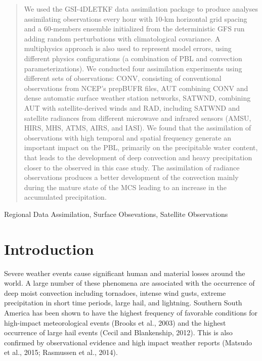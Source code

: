 \documentclass[final,5p,times,twocolumn,authoryear]{elsarticle} %
\begin{document}
\begin{frontmatter}
\begin{abstract}
  We used the GSI-4DLETKF data assimilation package to produce analyses assimilating observations every hour with 10-km horizontal grid spacing and a 60-members ensemble initialized from the deterministic GFS run adding random perturbations with climatological covariance. A multiphysics approach is also used to represent model errors, using different physics configurations (a combination of PBL and convection parameterizations). We conducted four assimilation experiments using different sets of observations: CONV, consisting of conventional observations from NCEP's prepBUFR files, AUT combining CONV and dense automatic surface weather station networks, SATWND, combining AUT with satellite-derived winds and RAD, including SATWND and satellite radiances from different microwave and infrared sensors (AMSU, HIRS, MHS, ATMS, AIRS, and IASI). We found that the assimilation of observations with high temporal and spatial frequency generate an important impact on the PBL, primarily on the precipitable water content, that leads to the development of deep convection and heavy precipitation closer to the observed in this case study. The assimilation of radiance observations produces a better development of the convection mainly during the mature state of the MCS leading to an increase in the accumulated precipitation.
  \end{abstract}
   \begin{keyword} Regional Data Assimilation, Surface Obsevations, Satellite Observations\end{keyword}
 \end{frontmatter}

\hypertarget{introduction}{%
\section{Introduction}\label{introduction}}

Severe weather events cause significant human and material losses around the world. A large number of these phenomena are associated with the occurrence of deep moist convection including tornadoes, intense wind gusts, extreme precipitation in short time periods, large hail, and lightning.
Southern South America has been shown to have the highest frequency of favorable conditions for high-impact meteorological events (Brooks et al., 2003) and the highest occurrence of large hail events (Cecil and Blankenship, 2012).
This is also confirmed by observational evidence and high impact weather reports (Matsudo et al., 2015; Rasmussen et al., 2014).
\end{document}
